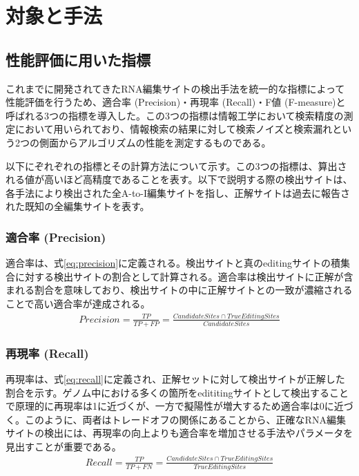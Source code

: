 \section{対象と手法}
\subsection{性能評価に用いた指標}
これまでに開発されてきたRNA編集サイトの検出手法を統一的な指標によって性能評価を行うため、適合率 (Precision)・再現率 (Recall)・F値 (F-measure)と呼ばれる3つの指標を導入した。この3つの指標は情報工学において検索精度の測定において用いられており、情報検索の結果に対して検索ノイズと検索漏れという2つの側面からアルゴリズムの性能を測定するものである。
\par
以下にぞれぞれの指標とその計算方法について示す。この3つの指標は、算出される値が高いほど高精度であることを表す。以下で説明する際の検出サイトは、各手法により検出された全A-to-I編集サイトを指し、正解サイトは過去に報告された既知の全編集サイトを表す。

\subsubsection{適合率 (Precision)}
適合率は、式\ref{eq:precision}に定義される。検出サイトと真のeditingサイトの積集合に対する検出サイトの割合として計算される。適合率は検出サイトに正解が含まれる割合を意味しており、検出サイトの中に正解サイトとの一致が濃縮されることで高い適合率が達成される。
\begin{eqnarray}
	Precision = \frac{TP}{TP + FP} = \frac{CandidateSites \cap TrueEditingSites}{CandidateSites}
	\label{eq:precision}
\end{eqnarray}

\subsubsection{再現率 (Recall)}
再現率は、式\ref{eq:recall}に定義され、正解セットに対して検出サイトが正解した割合を示す。ゲノム中における多くの箇所をedititingサイトとして検出することで原理的に再現率は1に近づくが、一方で擬陽性が増大するため適合率は0に近づく。このように、両者はトレードオフの関係にあることから、正確なRNA編集サイトの検出には、再現率の向上よりも適合率を増加させる手法やパラメータを見出すことが重要である。
\begin{eqnarray}
	Recall = \frac{TP}{TP+FN}
	= \frac{CandidateSites \cap TrueEditingSites}{TrueEditingSites}
	\label{eq:recall}
\end{eqnarray}

